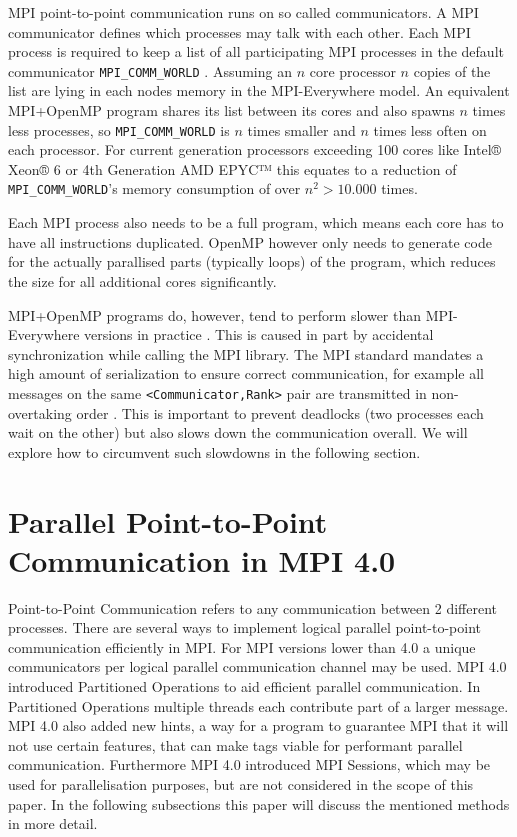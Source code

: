 \documentclass[sigconf]{acmart}
\begin{document}
MPI point-to-point communication runs on so called communicators.
A MPI communicator defines which processes may talk with each other.
Each MPI process is required to keep a list of all participating MPI processes in the default communicator \verb|MPI_COMM_WORLD| \cite{mpi40}.
Assuming an $n$ core processor $n$ copies of the list are lying in each nodes memory in the MPI-Everywhere model.
An equivalent MPI+OpenMP program shares its list between its cores and also spawns $n$ times less processes, so \verb|MPI_COMM_WORLD| is $n$ times smaller and $n$ times less often on each processor.
For current generation processors exceeding 100 cores like Intel® Xeon® 6 \cite{intelXeon6} or 4th Generation AMD EPYC™ \cite{amd4thGenEpyc} this equates to a reduction of \verb|MPI_COMM_WORLD|'s memory consumption of over $n^2 > 10.000$ times.

Each MPI process also needs to be a full program, which means each core has to have all instructions duplicated.
OpenMP however only needs to generate code for the actually parallised parts (typically loops) of the program, which reduces the size for all additional cores significantly.

MPI+OpenMP programs do, however, tend to perform slower than MPI-Everywhere versions in practice \cite{zambreLessonsLearned2022}.
This is caused in part by accidental synchronization while calling the MPI library.
The MPI standard mandates a high amount of serialization to ensure correct communication, for example all messages on the same \verb|<Communicator,Rank>| pair are transmitted in non-overtaking order \cite{mpi40}.
This is important to prevent deadlocks (two processes each wait on the other) but also slows down the communication overall.
We will explore how to circumvent such slowdowns in the following section.


\section{Parallel Point-to-Point Communication in MPI 4.0}

Point-to-Point Communication refers to any communication between 2 different processes.
There are several ways to implement logical parallel point-to-point communication efficiently in MPI.
For MPI versions lower than 4.0 a unique communicators per logical parallel communication channel may be used.
MPI 4.0 introduced Partitioned Operations to aid efficient parallel communication.
In Partitioned Operations multiple threads each contribute part of a larger message.
MPI 4.0 also added new hints, a way for a program to guarantee MPI that it will not use certain features, that can make tags viable for performant parallel communication.
Furthermore MPI 4.0 introduced MPI Sessions, which may be used for parallelisation purposes, but are not considered in the scope of this paper.
In the following subsections this paper will discuss the mentioned methods in more detail.
\end{document}
